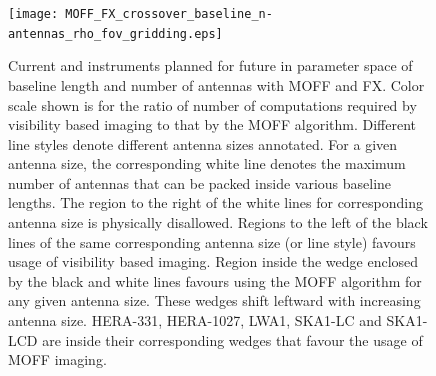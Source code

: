 \documentclass[a4paper,fleqn,usenatbib]{../mnras}
\begin{document}
\begin{figure}
  \texttt{[image: MOFF\_FX\_crossover\_baseline\_n-antennas\_rho\_fov\_gridding.eps]}
  \caption{Current and instruments planned for future in parameter space of
    baseline length and number of antennas with MOFF and FX. Color scale shown 
    is for the ratio of number of computations required by visibility based
    imaging to that by the MOFF algorithm. Different line styles denote 
    different antenna sizes annotated. For a given antenna size, the 
    corresponding white line denotes the maximum number of antennas that can 
    be packed inside various baseline lengths. The region to the right of the 
    white lines for corresponding antenna size is physically disallowed. 
    Regions to the left of the black lines of the same corresponding antenna 
    size (or line style) favours usage of visibility based imaging. Region 
    inside the wedge enclosed by the black and white lines favours using the 
    MOFF algorithm for any given antenna size. These wedges shift leftward with 
    increasing antenna size. HERA-331, HERA-1027, LWA1, SKA1-LC and SKA1-LCD
    are inside their corresponding wedges that favour the usage of MOFF 
    imaging.}
  \label{fig:parameter-space-bll-nant-instruments}
\end{figure}





\end{document}
